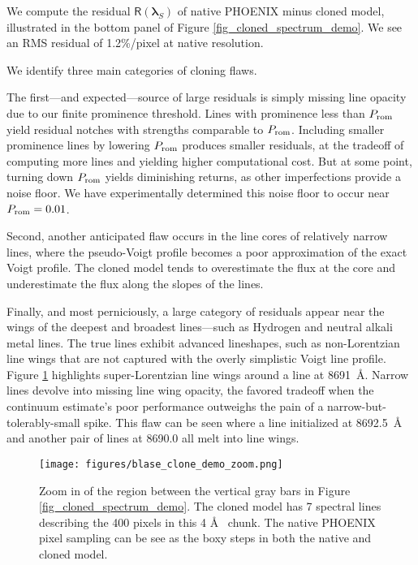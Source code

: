 \documentclass[modern]{aastex631}
\begin{document}
We compute the residual $\mathsf{R}(\bm{\lambda}_S)$ of native PHOENIX minus cloned model, illustrated in the bottom panel of Figure \ref{fig_cloned_spectrum_demo}. We see an RMS residual of 1.2\%/pixel at native resolution.

We identify three main categories of cloning flaws.

The first---and expected---source of large residuals is simply missing line opacity due to our finite prominence threshold. Lines with prominence less than $P_{\rm rom}$ yield residual notches with strengths comparable to $P_{\rm rom}$. Including smaller prominence lines by lowering $P_{\rm rom}$ produces smaller residuals, at the tradeoff of computing more lines and yielding higher computational cost.  But at some point, turning down $P_{\rm rom}$ yields diminishing returns, as other imperfections provide a noise floor.  We have experimentally determined this noise floor to occur near $P_{\rm rom}=0.01$.

Second, another anticipated flaw occurs in the line cores of relatively narrow lines, where the pseudo-Voigt profile becomes a poor approximation of the exact Voigt profile.  The cloned model tends to overestimate the flux at the core and underestimate the flux along the slopes of the lines.

Finally, and most perniciously, a large category of residuals appear near the wings of the deepest and broadest lines---such as Hydrogen and neutral alkali metal lines.  The true lines exhibit advanced lineshapes, such as non-Lorentzian line wings that are not captured with the overly simplistic Voigt line profile.  Figure \ref{fig_zoom_cloning_performance} highlights super-Lorentzian line wings around a line at 8691~\AA.  Narrow lines devolve into missing line wing opacity, the favored tradeoff when the continuum estimate's poor performance outweighs the pain of a narrow-but-tolerably-small spike. This flaw can be seen where a line initialized at 8692.5~\AA~ and another pair of lines at 8690.0 all melt into line wings.

\begin{figure}[hbt!]
    \centering
    \texttt{[image: figures/blase\_clone\_demo\_zoom.png]}
    \caption{Zoom in of the region between the vertical gray bars in Figure \ref{fig_cloned_spectrum_demo}. The cloned model has 7 spectral lines describing the 400 pixels in this 4 \AA~ chunk.  The native PHOENIX pixel sampling can be see as the boxy steps in both the native and cloned model.  }
    \label{fig_zoom_cloning_performance}
\end{figure}
\end{document}
